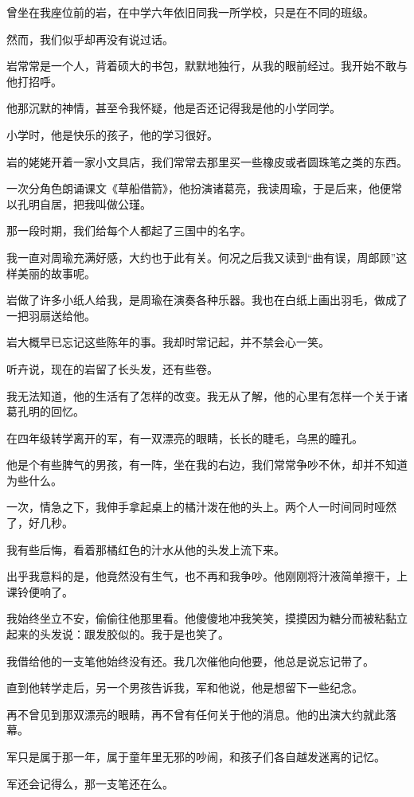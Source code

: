 \documentclass[12pt,a4paper]{article}
\begin{document}
		曾坐在我座位前的岩，在中学六年依旧同我一所学校，只是在不同的班级。\par
		然而，我们似乎却再没有说过话。

		岩常常是一个人，背着硕大的书包，默默地独行，从我的眼前经过。我开始不敢与他打招呼。\par
		他那沉默的神情，甚至令我怀疑，他是否还记得我是他的小学同学。

		小学时，他是快乐的孩子，他的学习很好。\par
		岩的姥姥开着一家小文具店，我们常常去那里买一些橡皮或者圆珠笔之类的东西。\par
		一次分角色朗诵课文《草船借箭》，他扮演诸葛亮，我读周瑜，于是后来，他便常以孔明自居，把我叫做公瑾。\par
		那一段时期，我们给每个人都起了三国中的名字。\par
		我一直对周瑜充满好感，大约也于此有关。何况之后我又读到“曲有误，周郎顾”这样美丽的故事呢。\par
		岩做了许多小纸人给我，是周瑜在演奏各种乐器。我也在白纸上画出羽毛，做成了一把羽扇送给他。\par
		岩大概早已忘记这些陈年的事。我却时常记起，并不禁会心一笑。

		听卉说，现在的岩留了长头发，还有些卷。\par
		我无法知道，他的生活有了怎样的改变。我无从了解，他的心里有怎样一个关于诸葛孔明的回忆。

		在四年级转学离开的军，有一双漂亮的眼睛，长长的睫毛，乌黑的瞳孔。\par
		他是个有些脾气的男孩，有一阵，坐在我的右边，我们常常争吵不休，却并不知道为些什么。\par
		一次，情急之下，我伸手拿起桌上的橘汁泼在他的头上。两个人一时间同时哑然了，好几秒。\par
		我有些后悔，看着那橘红色的汁水从他的头发上流下来。\par
		出乎我意料的是，他竟然没有生气，也不再和我争吵。他刚刚将汁液简单擦干，上课铃便响了。\par
		我始终坐立不安，偷偷往他那里看。他傻傻地冲我笑笑，摸摸因为糖分而被粘黏立起来的头发说：跟发胶似的。我于是也笑了。

		我借给他的一支笔他始终没有还。我几次催他向他要，他总是说忘记带了。\par
		直到他转学走后，另一个男孩告诉我，军和他说，他是想留下一些纪念。

		再不曾见到那双漂亮的眼睛，再不曾有任何关于他的消息。他的出演大约就此落幕。\par
		军只是属于那一年，属于童年里无邪的吵闹，和孩子们各自越发迷离的记忆。\par
		军还会记得么，那一支笔还在么。
\end{document}
